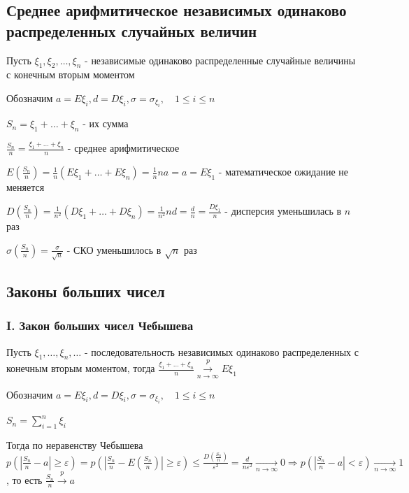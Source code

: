 \documentclass[12pt]{article}
\begin{document}
    \subsection{Среднее арифмитическое независимых одинаково распределенных случайных величин}

    Пусть $\xi_1, \xi_2, \dots, \xi_n$ - независимые одинаково распределенные случайные величины с конечным вторым моментом

    Обозначим $a = E\xi_i, d = D\xi_i, \sigma = \sigma_{\xi_i}, \quad 1 \leq i \leq n$

    $S_n = \xi_1 + \dots + \xi_n$ - их сумма

    $\frac{S_n}{n} = \frac{\xi_1 + \dots + \xi_n}{n}$ - среднее арифмитическое

    $E\left(\frac{S_n}{n}\right) = \frac{1}{n} (E\xi_1 + \dots + E\xi_n) = \frac{1}{n} na = a = E\xi_1$ - математическое ожидание не меняется

    $D\left(\frac{S_n}{n}\right) = \frac{1}{n^2} (D\xi_1 + \dots + D\xi_n) = \frac{1}{n^2} nd = \frac{d}{n} = \frac{D\xi_1}{n}$ - дисперсия уменьшилась в $n$ раз

    $\sigma\left(\frac{S_n}{n}\right) = \frac{\sigma}{\sqrt{n}}$ - СКО уменьшилось в $\sqrt{n}$ раз

    \subsection{Законы больших чисел}

    \subsubsection{I. Закон больших чисел Чебышева}

    \begin{MyTheorem}
        \Ths Пусть $\xi_1, \dots, \xi_n, \dots$ - последовательность независимых одинаково распределенных с конечным вторым моментом,
        тогда $\frac{\xi_1 + \dots + \xi_n}{n} \overset{p}{\underset{n \to \infty}{\longrightarrow}} E\xi_1$
    \end{MyTheorem}

    \begin{MyProof}
        Обозначим $a = E\xi_i, d = D\xi_i, \sigma = \sigma_{\xi_i}, \quad 1 \leq i \leq n$

        $S_n = \sum_{i = 1}^n \xi_i$

        Тогда по неравенству Чебышева $p\left(\left|\frac{S_n}{n} - a\right| \geq \varepsilon\right) = p\left(\left|\frac{S_n}{n} - E\left(\frac{S_n}{n}\right)\right| \geq \varepsilon\right) \leq
        \frac{D\left(\frac{S_n}{n}\right)}{\varepsilon^2} = \frac{d}{n\varepsilon^2} \underset{n \to \infty}{\longrightarrow} 0 \Longrightarrow p\left(|\frac{S_n}{n} - a| < \varepsilon\right) \underset{n \to \infty}{\longrightarrow} 1$,
        то есть $\frac{S_n}{n} \overset{p}{\longrightarrow} a$
    \end{MyProof}
\end{document}
